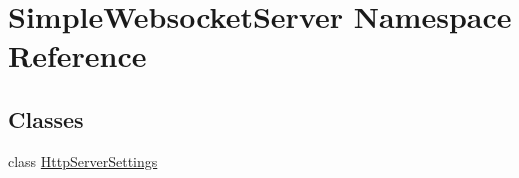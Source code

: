 \hypertarget{namespace_simple_websocket_server}{}\section{Simple\+Websocket\+Server Namespace Reference}
\label{namespace_simple_websocket_server}
\subsection*{Classes}
\begin{DoxyCompactItemize}
\item 
class \mbox{\hyperlink{class_simple_websocket_server_1_1_http_server_settings}{Http\+Server\+Settings}}
\end{DoxyCompactItemize}
